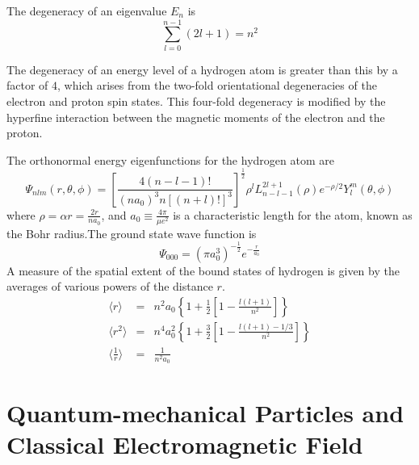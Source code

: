 The degeneracy of an eigenvalue $E_n$ is
\[\sum_{l=0}^{n-1} (2l+1) = n^2\]
\begin{note}
The degeneracy of an energy level of a hydrogen atom is greater than this by a factor of $4$, which arises from the two-fold orientational degeneracies of the electron and proton spin states. This four-fold degeneracy is modified by the hyperfine interaction between the magnetic moments of the electron and the proton.
\end{note}
The orthonormal energy eigenfunctions for the hydrogen atom are
\[\Psi_{nlm}(r,\theta,\phi) =  \left[ \frac{4(n-l-1)!}{(na_0)^3 n[(n+l)!]^3} \right]^{\frac{1}{2}} \rho^l L_{n-l-1}^{2l+1}(\rho) e^{-\rho/2} Y_l^m (\theta,\phi)\]
where $\rho = \alpha r = \frac{2r}{na_0}$, and $a_0 \equiv \frac{4\pi}{\mu e^2}$ is a characteristic length for the
atom, known as the Bohr radius.The ground state wave
function is
\[\Psi_{000} = (\pi a_0^3)^{-\frac{1}{2}} e^{-\frac{r}{a_0}}\]
A measure of the spatial extent of the bound states of hydrogen is given by the averages of various powers of the distance $r$.
\begin{eqnarray}
\langle r \rangle &=& n^2a_0 \left \{ 1 + \frac{1}{2} \left [ 1 - \frac{l(l+1)}{n^2} \right] \right\} \nonumber \\
\langle r^2 \rangle &=& n^4a_0^2 \left \{ 1 + \frac{3}{2} \left [ 1 - \frac{l(l+1)-1/3}{n^2} \right] \right\} \nonumber \\
\langle \frac{1}{r} \rangle &=& \frac{1}{n^2 a_0} \nonumber
\end{eqnarray}



\chapter{Quantum-mechanical Particles and Classical Electromagnetic Field}
